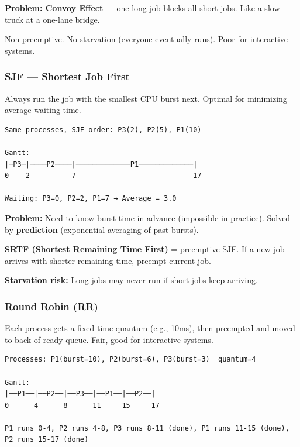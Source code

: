 \documentclass[11pt]{article}
\begin{document}
\textbf{Problem: Convoy Effect} --- one long job blocks all short jobs. Like a slow truck at a one-lane bridge.

Non-preemptive. No starvation (everyone eventually runs). Poor for interactive systems.

\subsubsection{SJF --- Shortest Job First}\label{sjf--shortest-job-first}

Always run the job with the smallest CPU burst next. Optimal for minimizing average waiting time.

\setcodelang{}

\begin{verbatim}
Same processes, SJF order: P3(2), P2(5), P1(10)

Gantt:
|─P3─|────P2────|─────────────P1─────────────|
0    2          7                            17

Waiting: P3=0, P2=2, P1=7 → Average = 3.0
\end{verbatim}

\textbf{Problem:} Need to know burst time in advance (impossible in practice). Solved by \textbf{prediction} (exponential averaging of past bursts).

\textbf{SRTF (Shortest Remaining Time First)} = preemptive SJF. If a new job arrives with shorter remaining time, preempt current job.

\textbf{Starvation risk:} Long jobs may never run if short jobs keep arriving.

\subsubsection{Round Robin (RR)}\label{round-robin-rr}

Each process gets a fixed time quantum (e.g., 10ms), then preempted and moved to back of ready queue. Fair, good for interactive systems.

\setcodelang{}

\begin{verbatim}
Processes: P1(burst=10), P2(burst=6), P3(burst=3)  quantum=4

Gantt:
|──P1──|──P2──|──P3──|──P1──|──P2──|
0      4      8      11     15     17

P1 runs 0-4, P2 runs 4-8, P3 runs 8-11 (done), P1 runs 11-15 (done), P2 runs 15-17 (done)
\end{verbatim}
\end{document}
